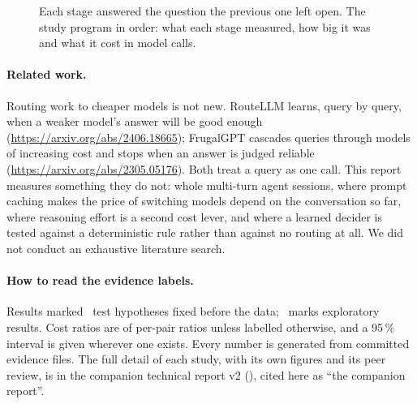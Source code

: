 \begin{figure}[htbp]
\centering

\caption{Each stage answered the question the previous one left open. The study program in order: what each stage measured, how big it was and what it cost in model calls.}
\label{fig:timeline}
\end{figure}

\paragraph{Related work.} Routing work to cheaper models is not new. RouteLLM learns, query by query, when a weaker
model's answer will be good enough (\url{https://arxiv.org/abs/2406.18665}); FrugalGPT cascades queries through models
of increasing cost and stops when an answer is judged reliable (\url{https://arxiv.org/abs/2305.05176}). Both treat a
query as one call. This report measures something they do not: whole multi-turn agent sessions, where prompt caching
makes the price of switching models depend on the conversation so far, where reasoning effort is a second cost lever,
and where a learned decider is tested against a deterministic rule rather than against no routing at all. We did not
conduct an exhaustive literature search.

\paragraph{How to read the evidence labels.} Results marked \prereg\ test hypotheses fixed before the data;
\screen\ marks exploratory results. Cost ratios are  of per-pair ratios unless labelled
otherwise, and a 95\,\% interval is given wherever one exists. Every number is generated from committed evidence
files. The full detail of each study, with its own figures and its peer review, is in the companion technical
report v2 (), cited here as ``the companion report''.


\begin{table}[htbp]
\centering\small
\caption{Findings at a glance. ``Preregistered'' means the hypothesis and its threshold were fixed before the data;
``replicated'' means an independent set of scenarios gave the same answer; ``exploratory'' findings are hypotheses.}
\label{tab:findings}

\end{table}
